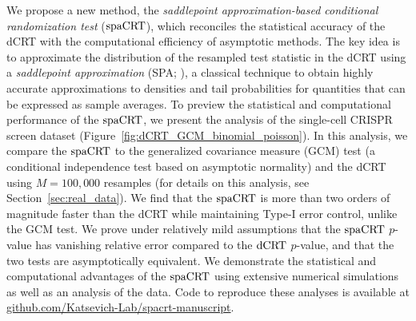 \documentclass[12pt]{article}
\theoremstyle{definition}
\newcommand{\dCRT}{\textnormal{dCRT}} 					%
\newcommand{\spacrt}{\textnormal{spaCRT}}               %
\begin{document}
We propose a new method, the \textit{saddlepoint approximation-based conditional randomization test} ($\spacrt$), which reconciles the statistical accuracy of the dCRT with the computational efficiency of asymptotic methods. The key idea is to approximate the distribution of the resampled test statistic in the dCRT using a \textit{saddlepoint approximation} (SPA; \cite{Daniels1954,Lugannani1980}), a classical technique to obtain highly accurate approximations to densities and tail probabilities for quantities that can be expressed as sample averages. To preview the statistical and computational performance of the $\spacrt$, we present the analysis of the \citet{Gasperini2019a} single-cell CRISPR screen dataset (Figure~\ref{fig:dCRT_GCM_binomial_poisson}). In this analysis, we compare the $\spacrt$ to the generalized covariance measure (GCM) test \citep{Shah2018} (a conditional independence test based on asymptotic normality) and the dCRT using $M = 100,000$ resamples (for details on this analysis, see Section~\ref{sec:real_data}). We find that the $\spacrt$ is more than two orders of magnitude faster than the dCRT while maintaining Type-I error control, unlike the GCM test. We prove under relatively mild assumptions that the $\spacrt$ $p$-value has vanishing relative error compared to the $\dCRT$ $p$-value, and that the two tests are asymptotically equivalent. We demonstrate the statistical and computational advantages of the $\spacrt$ using extensive numerical simulations as well as an analysis of the \citet{Gasperini2019a} data. Code to reproduce these analyses is available at \href{https://github.com/Katsevich-Lab/spacrt-manuscript}{github.com/Katsevich-Lab/spacrt-manuscript}. 
\end{document}
